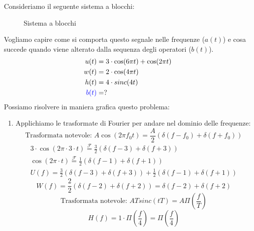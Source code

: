 \documentclass[a4paper]{article}
\begin{document}
\begin{example}
  Consideriamo il seguente sistema a blocchi:
  \begin{figure}[H]
    \centering
    \caption{Sistema a blocchi}
  \end{figure}
  \noindent
  Vogliamo capire come si comporta questo segnale nelle frequenze ($a(t)$) e cosa succede quando
  viene alterato dalla sequenza degli operatori ($b(t)$).
  \[
    \begin{aligned}
      u(t) &= 3 \cdot \cos(6 \pi t) + \cos(2 \pi t)\\
      w(t) &= 2 \cdot \cos(4 \pi t) \\
      h(t) &= 4 \cdot sinc(4t)\\
      \color{blue}b(t) &= ?
    \end{aligned}
  \] 
  Possiamo risolvere in maniera grafica questo problema:
  \begin{enumerate}
    \item Applichiamo le trasformate di Fourier per andare nel dominio delle frequenze:
      \[
      \text{Trasformata notevole: } A \cos(2 \pi f_0 t) = \frac{A}{2} \left( \delta(f - f_0) + \delta(f + f_0) \right)
      \] 
      \[
        \begin{aligned}
          3 \cdot \cos(2 \pi \cdot 3 \cdot t) \stackrel{\mathcal{F}}{=} \frac{3}{2} \left( \delta(f - 3) + \delta(f + 3) \right)\\
          \cos(2 \pi \cdot t) \stackrel{\mathcal{F}}{=} \frac{1}{2} \left( \delta(f - 1) + \delta(f + 1) \right)\\
          U(f) = \frac{3}{2} \left( \delta(f - 3) + \delta(f + 3) \right) + \frac{1}{2} \left( \delta(f - 1) + \delta(f + 1) \right)
        \end{aligned}
      \] 
      \vspace{1em}
      \noindent
      \[
      W(f) = \frac{2}{2} \left( \delta(f - 2) + \delta(f + 2) \right) 
      = \delta(f - 2) + \delta(f + 2)
      \] 
      \vspace{1em}
      \noindent
      \[
        \text{Trasformata notevole: } AT sinc(tT) = A \Pi\left(\frac{f}{T}\right)
      \] 
      \[
        H(f) = 1 \cdot \Pi(\frac{f}{4}) = \Pi(\frac{f}{4})
      \] 


\end{enumerate}
\end{example}
\end{document}
